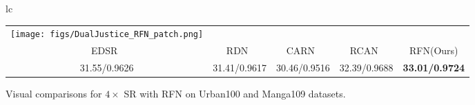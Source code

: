 \documentclass[preprint]{elsarticle}
\begin{document}
\begin{figure*}[htpb]
{\begin{tabular}{lc}
\begin{adjustbox}{valign=t}
\begin{tabular}{ccccc}
				\hspace{-3mm}
				\texttt{[image: figs/DualJustice\_RFN\_patch.png]} \\
				EDSR~\cite{EDSR} & \hspace{-3mm} RDN~\cite{RDN} & \hspace{-3mm} CARN~\cite{CARN} & \hspace{-3mm} RCAN~\cite{RCAN} & \hspace{-3mm} RFN(Ours) \\
				31.55/0.9626 & \hspace{-3mm} 31.41/0.9617 & \hspace{-3mm} 30.46/0.9516 & \hspace{-3mm} 32.39/0.9688 & \hspace{-3mm} \textbf{33.01/0.9724} \\
			\end{tabular}
		\end{adjustbox}
	\end{tabular} }
	\caption{Visual comparisons for $4 \times$ SR with RFN on Urban100 and Manga109 datasets.}
	\label{fig:compare-PSNR}
\end{figure*}
\end{document}
